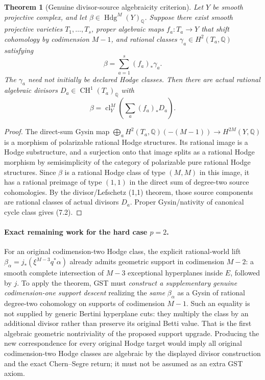 \documentclass[11pt]{article}
\newcommand{\Q}{\mathbb Q}
\newcommand{\CH}{\operatorname{CH}}
\newcommand{\Hdg}{\operatorname{Hdg}}
\newcommand{\cl}{\operatorname{cl}}
\newtheorem{theorem}{Theorem}[section]
\begin{document}
\begin{theorem}[Genuine divisor-source algebraicity criterion]
Let \(Y\) be smooth projective complex,
and let \(\beta\in\Hdg^M(Y)_\Q\).
Suppose there exist smooth projective
varieties \(T_1,\ldots,T_s\), proper
algebraic maps \(f_a:T_a\to Y\)
that shift cohomology by codimension
\(M-1\), and rational classes
\(\gamma_a\in H^2(T_a,\Q)\) satisfying
\[
 \boxed{\beta=\sum_{a=1}^s(f_a)_*\gamma_a.}
 \tag{7.1}
\]
The \(\gamma_a\) need not initially be
declared Hodge classes. Then there are
\emph{actual rational algebraic divisors}
\(D_a\in\CH^1(T_a)_\Q\)
with
\[
 \boxed{\beta=\cl_Y^M
              \left(\sum_a(f_a)_*D_a\right).}
 \tag{7.2}
\]
\end{theorem}
\begin{proof}
The direct-sum Gysin map
\(\bigoplus_a H^2(T_a,\Q)(-(M-1))
 \to H^{2M}(Y,\Q)\)
is a morphism of polarizable rational
Hodge structures. Its rational image is a
Hodge substructure, and a surjection onto
that image splits as a rational Hodge
morphism by semisimplicity of the
category of polarizable pure rational
Hodge structures. Since \(\beta\) is
a rational Hodge class of type
\((M,M)\) in this image,
it has a rational preimage of type
\((1,1)\) in the direct sum of
degree-two source cohomologies.
By the divisor/Lefschetz (1,1)
theorem, those source components
are rational classes of actual
divisors \(D_a\). Proper
Gysin/nativity of canonical cycle
class gives (7.2).
\end{proof}

\paragraph{Exact remaining work for the hard case \(p=2\).}
For an original codimension-two Hodge
class, the explicit rational-world lift
\(\beta_\alpha=j_*(\xi^{M-3}q^*\alpha)\)
already admits geometric support
in codimension \(M-2\):
a smooth complete intersection
of \(M-3\) exceptional hyperplanes
inside \(E\), followed by \(j\).
To apply the theorem, GST must
\emph{construct a supplementary
genuine codimension-one
support descent} realizing the
\emph{same} \(\beta_\alpha\)
as a Gysin of rational degree-two
cohomology on supports of codimension
\(M-1\). Such an equality is
not supplied by generic Bertini
hyperplane cuts: they multiply the
class by an additional divisor
rather than preserve its
original Betti value.
That is the first algebraic
geometric nontriviality of the
proposed support upgrade.
Producing the new correspondence
for every original Hodge target
would imply all original
codimension-two Hodge classes
are algebraic by the displayed
divisor construction and the exact
Chern--Segre return; it must not
be assumed as an extra GST axiom.
\end{document}
